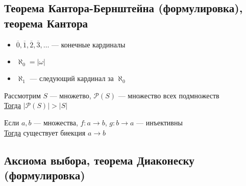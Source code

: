 \documentclass[english]{article}
\begin{document}
\subsection{Теорема Кантора-Бернштейна (формулировка), теорема Кантора}
\label{sec:orgb5d8fae}
\begin{remark}
	\-
	\begin{itemize}
		\item \(\overline{0}, \overline{1}, \overline{2}, \overline{3}, \dots\) --- конечные кардиналы
		\item \(\aleph_0 = |\omega|\)
		\item \(\aleph_1\) --- следующий кардинал за \(\aleph_0\)
	\end{itemize}
	\label{orgb6de8ea}
\end{remark}
\begin{theorem}[Кантора]
	Рассмотрим \(S\) --- множетво, \(\mathcal{P}(S)\) --- множество всех подмножеств \\
	\uline{Тогда} \(|\mathcal{P}(S)| > |S|\)
	\label{org92425c3}
\end{theorem}
\begin{theorem}
	Если \(a, b\) --- множества, \(f: a \to b\), \(g: b \to a\) --- инъективны \\
	\uline{Тогда} существует биекция \(a \to b\)
	\label{orgbdc08a9}
\end{theorem}
\subsection{Аксиома выбора, теорема Диаконеску (формулировка)}
\label{sec:org064eaea}
\end{document}
